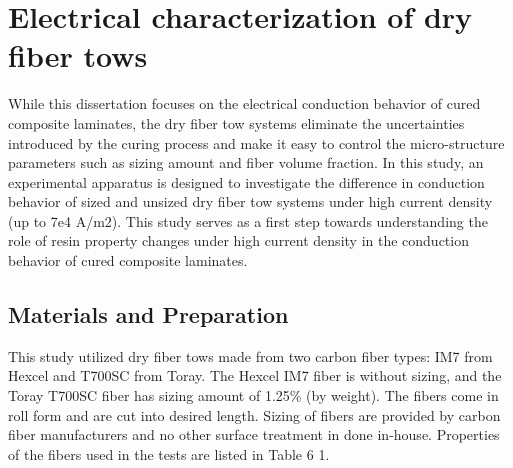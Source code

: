\section{Electrical characterization of dry fiber tows}
\label{Section:1} 
While this dissertation focuses on the electrical conduction behavior of cured composite laminates, the dry fiber tow systems eliminate the uncertainties introduced by the curing process and make it easy to control the micro-structure parameters such as sizing amount and fiber volume fraction. In this study, an experimental apparatus is designed to investigate the difference in conduction behavior of sized and unsized dry fiber tow systems under high current density (up to 7e4 A/m2). This study serves as a first step towards understanding the role of resin property changes under high current density in the conduction behavior of cured composite laminates.

\subsection{Materials and Preparation}
This study utilized dry fiber tows made from two carbon fiber types: IM7 from Hexcel and T700SC from Toray. The Hexcel IM7 fiber is without sizing, and the Toray T700SC fiber has sizing amount of 1.25\% (by weight). The fibers come in roll form and are cut into desired length. Sizing of fibers are provided by carbon fiber manufacturers and no other surface treatment in done in-house. Properties of the fibers used in the tests are listed in Table 6 1.